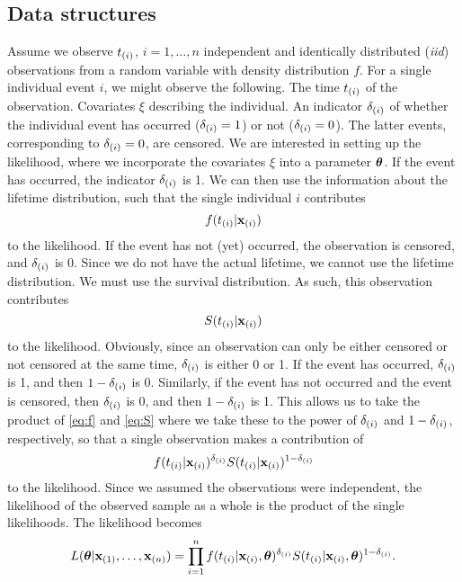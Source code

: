 \subsection{Data structures}\label{sec:surv-data}
Assume we observe $t_{(i)}$, $i=1,\dotsc,n$ independent and identically distributed (\textit{iid}) observations from a random variable with density distribution $f$. For a single individual event $i$, we might observe the following. The time $t_{(i)}$ of the observation. Covariates $\xi$ describing the individual. An indicator $\delta_{(i)}$ of whether the individual event has occurred ($\delta_{(i)} = 1$) or not ($\delta_{(i)} = 0$). The latter events, corresponding to $\delta_{(i)}=0$, are censored. We are interested in setting up the likelihood, where we incorporate the covariates $\xi$ into a parameter $\boldsymbol{\theta}$. If the event has occurred, the indicator $\delta_{(i)}$ is 1. We can then use the information about the lifetime distribution, such that the single individual $i$ contributes
\begin{equation}\label{eq:f}
    f(t_{(i)}|\mathbf{x}_{(i)})
\end{equation}
to the likelihood. If the event has not (yet) occurred, the observation is censored, and $\delta_{(i)}$ is 0. Since we do not have the actual lifetime, we cannot use the lifetime distribution. We must use the survival distribution. As such, this observation contributes
\begin{equation}\label{eq:S}
    S(t_{(i)}|\mathbf{x}_{(i)})
\end{equation}
to the likelihood. Obviously, since an observation can only be either censored or not censored at the same time, $\delta_{(i)}$ is either 0 or 1. If the event has occurred, $\delta_{(i)}$ is 1, and then $1-\delta_{(i)}$ is 0. Similarly, if the event has not occurred and the event is censored, then $\delta_{(i)}$
 is 0, and then $1-\delta_{(i)}$ is 1. This allows us to take the product of \eqref{eq:f} and \eqref{eq:S} where we take these to the power of $\delta_{(i)}$ and $1-\delta_{(i)}$, respectively, so that a single observation makes a contribution of
\begin{equation*}
    f(t_{(i)}|\mathbf{x}_{(i)})^{\delta_{(i)}}S(t_{(i)}|\mathbf{x}_{(i)})^{1-\delta_{(i)}}
\end{equation*}
to the likelihood. Since we assumed the observations were independent, the likelihood of the observed sample as a whole is the product of the single likelihoods. The likelihood becomes
\begin{equation}\label{eq:surv-lik}
    L(\boldsymbol{\theta}|\mathbf{x}_{(1)},\ldots,\mathbf{x}_{(n)})=\prod_{i=1}^n f(t_{(i)}|\mathbf{x}_{(i)},\boldsymbol{\theta})^{\delta_{(i)}} S(t_{(i)}|\mathbf{x}_{(i)},\boldsymbol{\theta})^{1-\delta_{(i)}}.
\end{equation}
